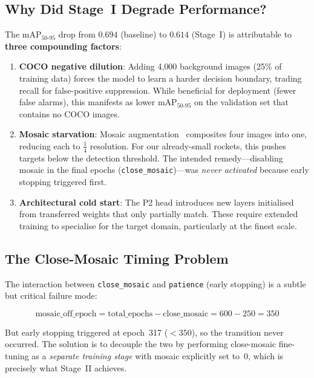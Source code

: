 \documentclass[12pt, titlepage]{article}
\begin{document}
\subsection{Why Did Stage~I Degrade Performance?}

The mAP$_{50\text{-}95}$ drop from $0.694$ (baseline) to $0.614$ (Stage~I) is
attributable to \textbf{three compounding factors}:

\begin{enumerate}[leftmargin=*]
  \item \textbf{COCO negative dilution}: Adding 4{,}000 background
        images (25\% of training data) forces the model to learn a
        harder decision boundary, trading recall for
        false-positive suppression.  While beneficial for deployment
        (fewer false alarms), this manifests as lower
        mAP$_{50\text{-}95}$ on the validation set that contains no COCO images.

  \item \textbf{Mosaic starvation}: Mosaic augmentation~\citep{bochkovskiy2020yolov4}
        composites four images into one,
        reducing each to $\frac{1}{4}$ resolution.  For our
        already-small rockets, this pushes targets below the
        detection threshold.  The intended remedy---disabling mosaic
        in the final epochs (\texttt{close\_mosaic})---was
        \emph{never activated} because early stopping triggered first.

  \item \textbf{Architectural cold start}: The P2 head introduces new
        layers initialised from transferred weights that only
        partially match.  These require extended training to specialise
        for the target domain, particularly at the finest scale.
\end{enumerate}

\subsection{The Close-Mosaic Timing Problem}
\label{sec:close_mosaic}

The interaction between \texttt{close\_mosaic} and \texttt{patience} (early
stopping) is a subtle but critical failure mode:

\[
  \text{mosaic\_off\_epoch} = \text{total\_epochs} - \text{close\_mosaic}
  = 600 - 250 = 350
\]

But early stopping triggered at epoch~317 ($<350$), so the transition never
occurred. The solution is to decouple the two by performing close-mosaic
fine-tuning as a \emph{separate training stage} with mosaic explicitly set
to~$0$, which is precisely what Stage~II achieves.
\end{document}
